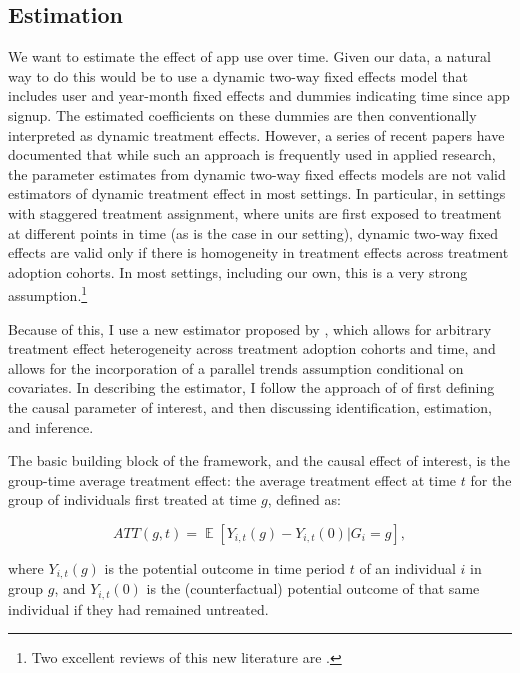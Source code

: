\subsection{Estimation}%
\label{sub:estimation}

We want to estimate the effect of app use over time.  Given our data, a natural
way to do this would be to use a dynamic two-way fixed effects model that
includes user and year-month fixed effects and dummies indicating time since
app signup. The estimated coefficients on these dummies are then conventionally
interpreted as dynamic treatment effects. However, a series of recent papers
have documented that while such an approach is frequently used in applied
research, the parameter estimates from dynamic two-way fixed effects models are
not valid estimators of dynamic treatment effect in most settings. In
particular, in settings with staggered treatment assignment, where units are
first exposed to treatment at different points in time (as is the case in our
setting), dynamic two-way fixed effects are valid only if there is homogeneity
in treatment effects across treatment adoption cohorts. In most settings,
including our own, this is a very strong assumption.\footnote{Two excellent
reviews of this new literature are \citet{roth2022trending, baker2022much}.}

Because of this, I use a new estimator proposed by
\citet{callaway2021difference}, which allows for arbitrary treatment effect
heterogeneity across treatment adoption cohorts and time, and allows for the
incorporation of a parallel trends assumption conditional on covariates. In
describing the estimator, I follow the approach of
\citet{callaway2021difference} of first defining the causal parameter of
interest, and then discussing identification, estimation, and inference.

The basic building block of the framework, and the causal effect of interest,
is the group-time average treatment effect: the average treatment effect at
time $t$ for the group of individuals first treated at time $g$, defined as:

\begin{equation}
    ATT(g,t) = \mathop{\mathbb{E}}[Y_{i,t}(g) - Y_{i,t}(0)|G_i =
    g],
\end{equation}

where $Y_{i,t}(g)$ is the potential outcome in time period $t$ of an individual
$i$ in group $g$, and $Y_{i,t}(0)$ is the (counterfactual) potential outcome of that same
individual if they had remained untreated.

